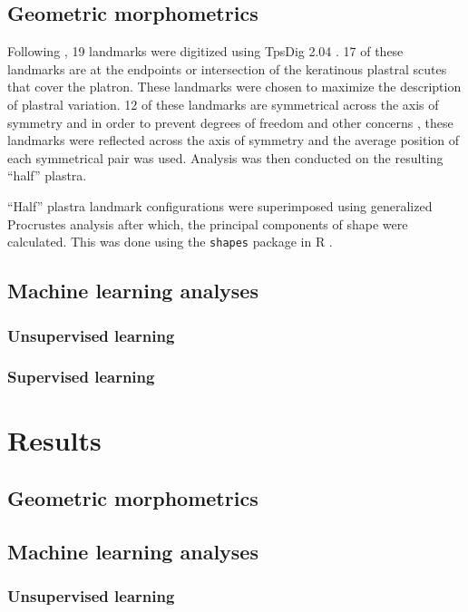 \documentclass[12pt]{article}\usepackage{graphicx, color}
\begin{document}
\subsection{Geometric morphometrics}
Following \citet{Angielczyk2011}, 19 landmarks were digitized using TpsDig 2.04 \citep{Rohlf2005}. 17 of these landmarks are at the endpoints or intersection of the keratinous plastral scutes that cover the platron. These landmarks were chosen to maximize the description of plastral variation. 12 of these landmarks are symmetrical across the axis of symmetry and in order to prevent degrees of freedom and other concerns \citep{Klingenberg2007}, these landmarks were reflected across the axis of symmetry and the average position of each symmetrical pair was used. Analysis was then conducted on the resulting ``half'' plastra.

``Half'' plastra landmark configurations were superimposed using generalized Procrustes analysis \citep{Dryden1998a} after which, the principal components of shape were calculated. This was done using the \texttt{shapes} package in R \citep{2013, Dryden2013}.

\subsection{Machine learning analyses}
\subsubsection{Unsupervised learning}

\subsubsection{Supervised learning}



\section{Results}
\subsection{Geometric morphometrics}

\subsection{Machine learning analyses}
\subsubsection{Unsupervised learning}
\end{document}
